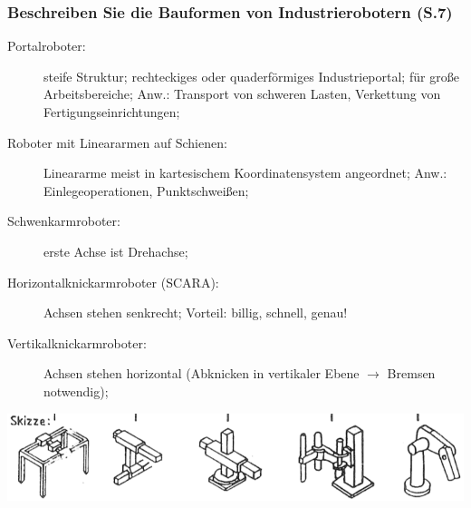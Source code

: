 \documentclass[12pt,a4paper,titlepage,oneside]{article}
\begin{document}
\subsubsection*{Beschreiben Sie die Bauformen von Industrierobotern (S.7)}
\begin{description}
\item[Portalroboter:] steife Struktur; rechteckiges oder quaderförmiges Industrieportal; 
  für große Arbeitsbereiche; Anw.: Transport von schweren Lasten, Verkettung von 
  Fertigungseinrichtungen;
\item[Roboter mit Lineararmen auf Schienen:] Lineararme meist in kartesischem Koordinatensystem
  angeordnet; Anw.: Einlegeoperationen, Punktschweißen;
\item[Schwenkarmroboter:] erste Achse ist Drehachse;
\item[Horizontalknickarmroboter (SCARA):] Achsen stehen senkrecht; Vorteil: billig, schnell, 
  genau!
\item[Vertikalknickarmroboter:] Achsen stehen horizontal (Abknicken in vertikaler Ebene 
  $\rightarrow$ Bremsen notwendig);
\end{description}
\includegraphics[width=\textwidth]{pics/bauarten}
\end{document}
